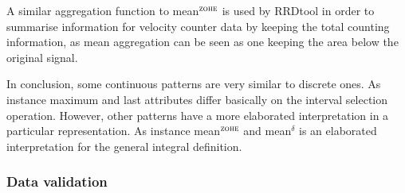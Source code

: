 A similar aggregation function to mean$^\zohe{}$ is used by RRDtool
\cite{rrdtool} in order to summarise information for velocity counter
data by keeping the total counting information, as mean aggregation
can be seen as one keeping the area below the original signal.


In conclusion, some continuous patterns are very similar to discrete
ones. As instance maximum and last attributes differ basically on the
interval selection operation. However, other patterns have a more
elaborated interpretation in a particular representation. As instance
mean$^\zohe{}$ and mean$^\delta$ is an elaborated interpretation for
the general integral definition.




\subsubsection{Data validation}




